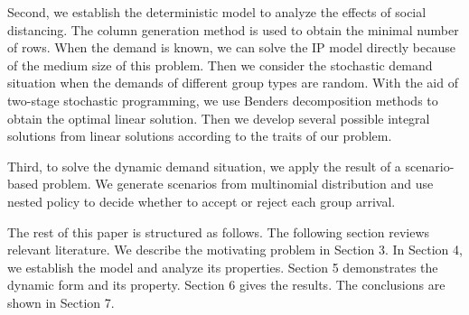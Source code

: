 Second, we establish the deterministic model to analyze the effects of social distancing. The column generation method is used to obtain the minimal number of rows. When the demand is known, we can solve the IP model directly because of the medium size of this problem. Then we consider the stochastic demand situation when the demands of different group types are random. With the aid of two-stage stochastic programming, we use Benders decomposition methods to obtain the optimal linear solution. Then we develop several possible integral solutions from linear solutions according to the traits of our problem.



Third, to solve the dynamic demand situation, we apply the result of a scenario-based problem. We generate scenarios from multinomial distribution and use nested policy to decide whether to accept or reject each group arrival.




The rest of this paper is structured as follows. The following section reviews relevant literature. We describe the motivating problem in Section 3. In Section 4, we establish the model and analyze its properties. Section 5 demonstrates the dynamic form and its property. Section 6 gives the results. The conclusions are shown in Section 7.

\newpage
